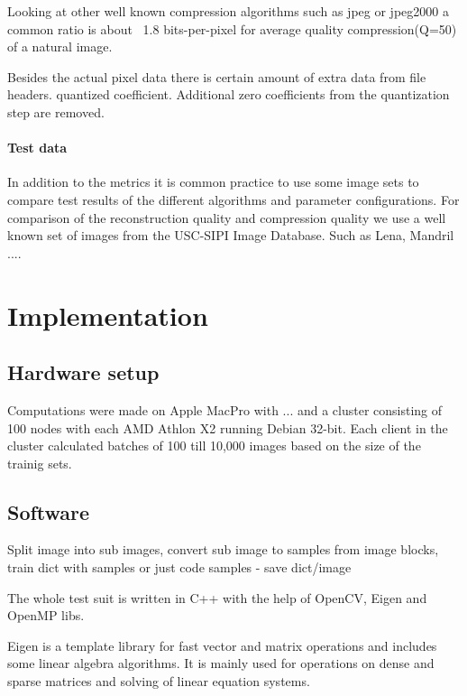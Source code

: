 Looking at other well known compression algorithms such as jpeg or jpeg2000
a common ratio is about ~1.8 bits-per-pixel for average quality
compression(Q=50) of a natural image. 

Besides the actual pixel data there is certain amount of extra data from file
headers. 
quantized coefficient. Additional zero coefficients from the quantization step
are removed.

\paragraph{Test data}
In addition to the metrics it is common practice to use some image sets to
compare test results of the different algorithms and parameter configurations.
For comparison of the reconstruction quality and compression quality we use a
well known set of images from the USC-SIPI Image Database. Such as Lena, Mandril
....

\section{Implementation}
%

\subsection*{Hardware setup}
Computations were made on Apple MacPro with ... 
and a cluster consisting of 100 nodes with each AMD Athlon X2  running Debian 32-bit. Each client in the cluster calculated batches of
100 till 10,000 images based on the size of the trainig sets.

\subsection*{Software}

Split image into sub images, convert sub image to samples from image blocks, 
train dict with samples or just code samples - save dict/image

The whole test suit is written in C++ with the help  of OpenCV, Eigen and OpenMP libs.

Eigen \cite{Eigen} is a template library for fast vector and matrix operations 
and includes some linear algebra algorithms. It is mainly used for operations on
dense and sparse matrices and solving of linear equation systems.

